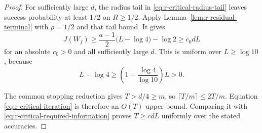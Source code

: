 \begin{proof}
For sufficiently large \(d\), the radius tail in
\eqref{eq:r-critical-radius-tail} leaves success probability at
least \(1/2\) on \(R\ge1/2\).  Apply
Lemma~\ref{lem:r-residual-terminal} with \(\rho=1/2\) and
that tail bound.  It gives
\begin{equation}\label{eq:r-critical-required-information}
 J(W_f)\ge\frac{a-1}{2}\bigl(L-\log4\bigr)-\log2
          \ge c_0dL
\end{equation}
for an absolute \(c_0>0\) and all sufficiently large \(d\).
This is uniform over \(L\ge\log10\), because
\[
 L-\log4\ge
 \left(1-\frac{\log4}{\log10}\right)L>0 .
\]

The common stopping reduction gives \(T>d/4\ge m\), so
\(\lceil T/m\rceil\le2T/m\).  Equation
\eqref{eq:r-critical-iteration} is therefore an \(O(T)\) upper
bound.  Comparing it with
\eqref{eq:r-critical-required-information} proves \(T\ge cdL\)
uniformly over the stated accuracies.
\end{proof}




